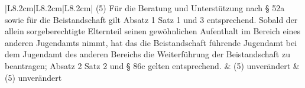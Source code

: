 \documentclass[10pt,a4paper,landscape]{article}
\begin{document}
\begin{longtable}{|L{8.2cm}|L{8.2cm}|L{8.2cm}|}
\hhline{|---|}
(5) Für die Beratung und Unterstützung  \newline nach \S{} 52a sowie für die Beistandschaft gilt  \newline Absatz 1 Satz 1 und 3 entsprechend.  \newline Sobald der allein sorgeberechtigte  \newline Elternteil seinen gewöhnlichen Aufenthalt  \newline im Bereich eines anderen Jugendamts  \newline nimmt, hat das die Beistandschaft führende  \newline Jugendamt bei dem Jugendamt des  \newline anderen Bereichs die Weiterführung der  \newline Beistandschaft zu beantragen; Absatz 2  \newline Satz 2 und \S{} 86c gelten entsprechend. & (5) unverändert & (5) unverändert \\
\hhline{|---|}

\end{longtable}
\end{document}
